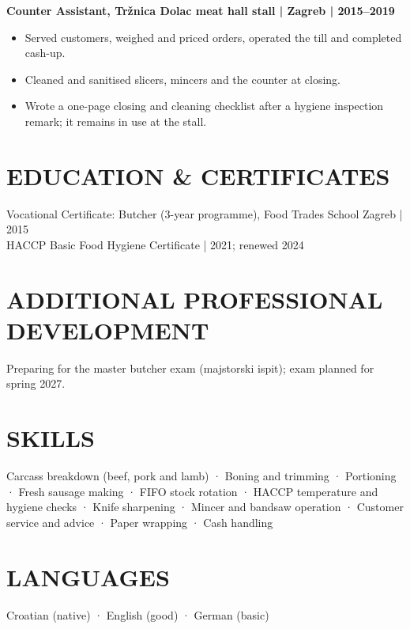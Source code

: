 \documentclass[11pt,a4paper]{article}
\begin{document}
\textbf{Counter Assistant, Tržnica Dolac meat hall stall | Zagreb | 2015–2019}
\begin{itemize}
\item Served customers, weighed and priced orders, operated the till and completed cash-up.
\item Cleaned and sanitised slicers, mincers and the counter at closing.
\item Wrote a one-page closing and cleaning checklist after a hygiene inspection remark; it remains in use at the stall.
\end{itemize}

\section*{EDUCATION \& CERTIFICATES}
Vocational Certificate: Butcher (3-year programme), Food Trades School Zagreb | 2015\\
HACCP Basic Food Hygiene Certificate | 2021; renewed 2024

\section*{ADDITIONAL PROFESSIONAL DEVELOPMENT}
Preparing for the master butcher exam (majstorski ispit); exam planned for spring 2027.

\section*{SKILLS}
Carcass breakdown (beef, pork and lamb) · Boning and trimming · Portioning · Fresh sausage making · FIFO stock rotation · HACCP temperature and hygiene checks · Knife sharpening · Mincer and bandsaw operation · Customer service and advice · Paper wrapping · Cash handling

\section*{LANGUAGES}
Croatian (native) · English (good) · German (basic)
\end{document}
